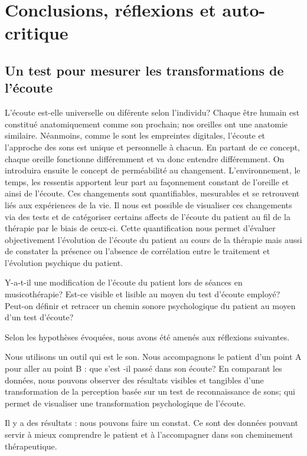
\chapter{Conclusions, réflexions et auto-critique}

 
\section{Un test pour mesurer les trans\-for\-ma\-tions de l'écoute}

L'écoute est-elle universelle ou diférente selon l'individu?
 Chaque être humain est constitué anatomiquement comme son prochain;
 nos oreilles ont  une anatomie similaire. Néanmoins, comme le sont 
les empreintes digitales, l'écoute et l'approche des sons est unique
et personnelle à chacun. En partant de ce concept, chaque oreille
fonctionne différemment et va donc entendre différemment. On
introduira ensuite le concept de perméabilité au
changement. L'environnement, le temps, les ressentis apportent leur
part au façonnement constant de l'oreille et ainsi de l'écoute. Ces
changements sont quantifiables, mesurables et se retrouvent liés aux
expériences de la vie. Il nous est possible de visualiser ces
changements via des tests et de catégoriser certains affects de
l'écoute du patient au fil de la thérapie par le biais de
ceux-ci. Cette quantification nous permet d'évaluer objectivement
l'évolution de l'écoute du patient au cours de la thérapie  mais aussi
de constater la présence ou l'absence de corrélation entre le
traitement et l'évolution psychique du patient.

Y-a-t-il une modification de l'écoute du patient lors de séances en musicothérapie?
Est-ce visible et lisible au moyen du test d'écoute employé?
Peut-on définir et retracer un chemin sonore psychologique du patient au moyen d'un test d'écoute?


Selon les hypothèses évoquées, nous avons été amenés aux réflexions suivantes.

Nous utilisons un outil qui est le son. Nous accompagnons
le patient d'un point A pour aller au point B : que s'est -il passé
dans son écoute?
En comparant les données, nous pouvons observer des résultats visibles et tangibles 
d'une transformation de la
perception basée sur un test de reconnaissance de sons;  qui permet de visualiser une transformation psychologique
de l'écoute. 


Il y a des résultats : nous pouvons faire un constat.
Ce sont des données pouvant servir à mieux comprendre le patient
et à l'accompagner dans son cheminement thérapeutique.


